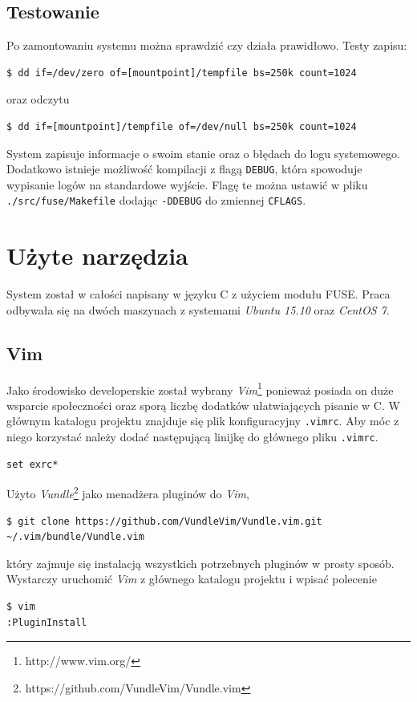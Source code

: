 \subsection{Testowanie}
Po zamontowaniu systemu można sprawdzić czy działa prawidłowo.
Testy zapisu:
\begin{verbatim}
$ dd if=/dev/zero of=[mountpoint]/tempfile bs=250k count=1024
\end{verbatim}
\noindent oraz odczytu
\begin{verbatim}
$ dd if=[mountpoint]/tempfile of=/dev/null bs=250k count=1024
\end{verbatim}

System zapisuje informacje o swoim stanie oraz o błędach do logu systemowego.
Dodatkowo istnieje możliwość kompilacji z flagą \texttt{DEBUG}, która spowoduje
wypisanie logów na standardowe wyjście. Flagę te można ustawić
w pliku \texttt{./src/fuse/Makefile} dodając \texttt{-DDEBUG} do zmiennej \texttt{CFLAGS}.

\section{Użyte narzędzia}
System został w całości napisany w języku C z użyciem modułu FUSE. Praca odbywała się na 
dwóch maszynach z systemami \emph{Ubuntu 15.10} oraz \emph{CentOS 7}.

\subsection{Vim}
Jako środowisko developerskie został wybrany \emph{Vim}\footnote{http://www.vim.org/} ponieważ
posiada on duże wsparcie społeczności oraz sporą liczbę dodatków ułatwiających
pisanie w C.
W głównym katalogu projektu znajduje się plik konfiguracyjny \texttt{.vimrc}. Aby móc
z niego korzystać należy dodać następującą linijkę do głównego pliku \texttt{.vimrc}.
\begin{verbatim}
set exrc*
\end{verbatim}

Użyto \emph{Vundle}\footnote{https://github.com/VundleVim/Vundle.vim} jako menadżera pluginów
do \emph{Vim},
\begin{verbatim}
$ git clone https://github.com/VundleVim/Vundle.vim.git ~/.vim/bundle/Vundle.vim
\end{verbatim}
który zajmuje się instalacją wszystkich potrzebnych pluginów w prosty sposób. Wystarczy uruchomić
\emph{Vim} z głównego katalogu projektu i wpisać polecenie
\begin{verbatim}
$ vim
:PluginInstall
\end{verbatim}

